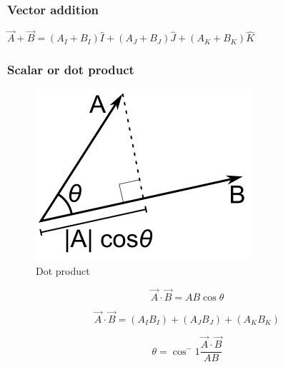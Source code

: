 \documentclass{article}
\begin{document}
\subsubsection*{Vector addition}
$\vec{A} + \vec{B} = (A_I + B_I)\hat{I} + (A_J + B_J)\hat{J} + (A_K + B_K)\hat{K}$

\subsubsection*{Scalar or dot product}

\begin{multicols}{3}
	\begin{figure}[H]
		\centering
		\includegraphics[width=0.6\linewidth]{img/dot_product}
		\caption{Dot product}
		\label{fig:dot_product}
	\end{figure}

	\columnbreak
	\begin{equation*}
	\boxed{\vec{A}\cdot\vec{B} = AB\cos\theta}
	\end{equation*}

	\begin{equation*}
	\boxed{\vec{A}\cdot\vec{B} = (A_IB_I) + (A_JB_J) + (A_KB_K)}
	\end{equation*}

	\vfill\null
	\columnbreak

	\begin{equation*}
	\boxed{\theta = \cos^-1 \dfrac{\vec{A}\cdot\vec{B}}{AB}}
	\end{equation*}
\end{multicols}
\end{document}
